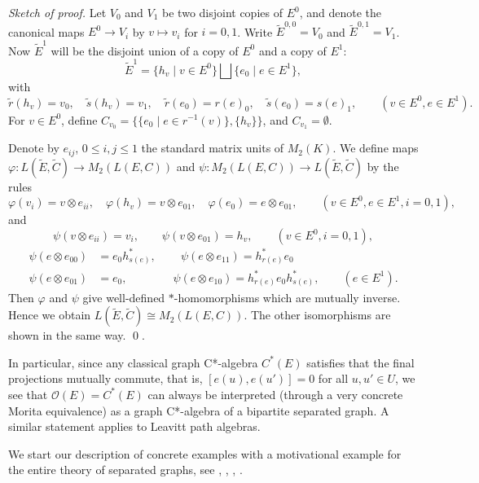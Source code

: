 \documentclass[11pt]{amsart}
\theoremstyle{plain}            %
\theoremstyle{definition}       %
\theoremstyle{definition}       %
\theoremstyle{remark}
\begin{document}
{\it Sketch of proof.}
Let $V_0$ and $V_1$ be two disjoint copies of $E^0$, and denote the
canonical maps $E^0\to V_i$ by $v\mapsto v_i$ for $i=0,1$.  Write
$\widetilde{E}^{0,0}= V_0$ and $\widetilde{E}^{0,1}=  V_1$. Now
$\widetilde{E}^1$ will be the disjoint union of a copy of $E^0$ and
a copy of $E^1$: $$\widetilde{E}^1= \{h_v\mid v\in E^0 \} \bigsqcup
\{e_0\mid e\in E^1 \},$$ with
$$
\tilde{r}(h_v)=v_0, \quad \tilde{s}(h_v)=v_1, \quad \tilde{r}(e_0)=
r(e)_0, \quad \tilde{s}(e_0)= s(e)_1, \qquad (v\in E^0, e\in E^1 )
.$$ 
For $v\in E^0$, define $C_{v_0}=\{\{e_0 \mid e\in r^{-1}(v)\} , \{h_v\} \}$, and $C_{v_1} = \emptyset$.

Denote by $e_{ij}$, $0\le i,j\le 1$ the standard matrix units of
$M_2(K)$.  We define maps $\varphi \colon L(\widetilde{E},
\widetilde{C})\to M_2(L(E,C))$ and $\psi \colon M_2(L(E,C))\to
L(\widetilde{E},\widetilde{C})$ by the rules
$$\varphi (v_i)= v\otimes e_{ii},\quad \varphi (h_v)= v\otimes
e_{01},\quad \varphi (e_0)= e\otimes e_{01}, \qquad (v\in E^0, e\in
E^1, i=0,1) ,$$ and
$$\psi (v\otimes e_{ii}) =v_i,\qquad \psi (v\otimes e_{01})=h_v,
\qquad (v\in E^0, i=0,1) ,$$
\begin{align*}\psi (e\otimes e_{00}) & =
	e_0h_{s(e)}^*,\qquad \, \psi (e\otimes e_{11})  = h ^*_{r(e)}e_0\\
	\psi
	(e\otimes e_{01}) & =e_0,\qquad \qquad \psi (e\otimes e_{10})  =
	h^*_{r(e)} e_0 h^*_{s(e)}, \qquad (e\in E^1) .
\end{align*}
Then $\varphi$ and $\psi$ give well-defined $*$-homomorphisms which are
mutually inverse. Hence we obtain $L(\widetilde{E},\widetilde{C}) \cong  M_2(L(E,C))$.
The other isomorphisms are shown in the same way. \qed.

In particular, since any classical graph C*-algebra $C^*(E)$
satisfies that the final projections mutually commute, that is, $[e(u),e(u')]=0$ for all
$u,u'\in U$, we see that $\mathcal O (E)= C^*(E)$ can always be
interpreted (through a very concrete Morita equivalence) as a graph
C*-algebra of a bipartite separated graph. A similar statement
applies to Leavitt path algebras.


We start our description of concrete examples with a motivational
example for the entire theory of separated graphs, see \cite{ag11},
\cite{ag12}, \cite{aek13}, \cite{ae14}.
\end{document}
